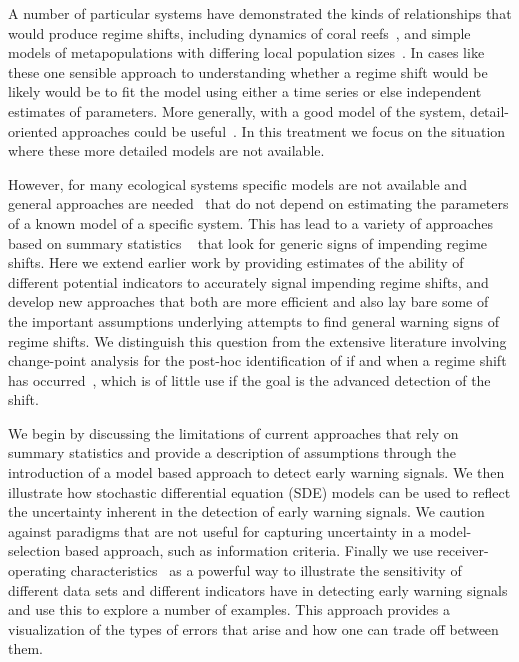 \documentclass[authoryear,review,11pt]{elsarticle}
\begin{document}
A number of particular systems have demonstrated the kinds of relationships that would produce regime shifts,
including dynamics of coral reefs~\citep{Mumby2007},
and simple models of metapopulations with differing local population sizes~\citep{Hastings1991a}.
In cases like these one sensible approach to understanding 
whether a regime shift would be likely would be 
to fit the model using either a time series or else independent estimates of parameters. 
More generally, with a good model of the system, detail-oriented approaches could be useful~\citep{Lade2012}.  
In this treatment we focus on the situation where these more detailed models are not available.  

However, for many ecological systems specific models are not available and general approaches are needed~\citep{Scheffer2009, Lade2012}
that do not depend on estimating the parameters of a known model of a specific system. 
This has lead to a variety of approaches based on summary statistics
~\citep[\emph{e.g.}][]{Carpenter2006, Held2004, Dakos2008, Guttal2008, Biggs2009, Carpenter2011, Seekell2011}
that look for generic signs of impending regime shifts.  
Here we extend earlier work by providing estimates 
of the ability of different potential indicators to accurately signal impending regime shifts,
and develop new approaches that both are more efficient
and also lay bare some of the important assumptions underlying attempts 
to find general warning signs of regime shifts.  
We distinguish this question from the extensive literature involving change-point analysis 
for the post-hoc identification of if and when a regime shift has occurred~\citep{Easterling1995, Rodionov2004, Lenton2009}, 
which is of little use if the goal is the advanced detection of the shift.  


We begin by discussing the limitations of current approaches that rely on summary statistics
and provide a description of assumptions through the introduction of a model based approach to detect early warning signals.
We then illustrate how stochastic differential equation (SDE) models can be used
to reflect the uncertainty inherent in the detection of early warning signals. 
We caution against paradigms that are not useful for capturing uncertainty in
a model-selection based approach, such as information criteria.
Finally we use receiver-operating characteristics~\citep{Green1989, Keller2009}
as a powerful way to illustrate the sensitivity of different data sets
and different indicators have in detecting early warning signals and use this to explore a number of examples.
This approach provides a visualization of the types of errors that arise and how one can trade off between them.  
\end{document}
